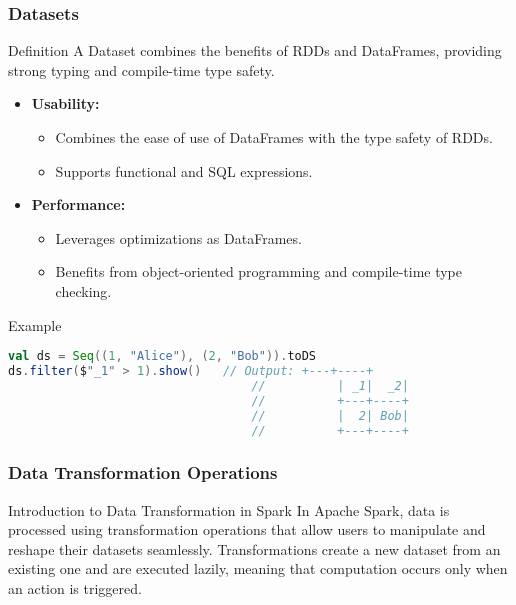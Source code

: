 \documentclass{beamer}
\begin{document}
\begin{frame}[fragile]
    \frametitle{Datasets}
    \begin{block}{Definition}
        A Dataset combines the benefits of RDDs and DataFrames, providing strong typing and compile-time type safety.
    \end{block}

    \begin{itemize}
        \item \textbf{Usability:}
        \begin{itemize}
            \item Combines the ease of use of DataFrames with the type safety of RDDs.
            \item Supports functional and SQL expressions.
        \end{itemize}
        \item \textbf{Performance:}
        \begin{itemize}
            \item Leverages optimizations as DataFrames.
            \item Benefits from object-oriented programming and compile-time type checking.
        \end{itemize}
    \end{itemize}

    \begin{block}{Example}
    \begin{lstlisting}[language=Scala]
val ds = Seq((1, "Alice"), (2, "Bob")).toDS
ds.filter($"_1" > 1).show()   // Output: +---+----+
                                  //          | _1|  _2|
                                  //          +---+----+
                                  //          |  2| Bob|
                                  //          +---+----+
    \end{lstlisting}
    \end{block}
\end{frame}

\begin{frame}[fragile]
    \frametitle{Data Transformation Operations}
    \begin{block}{Introduction to Data Transformation in Spark}
        In Apache Spark, data is processed using transformation operations that allow users to manipulate and reshape their datasets seamlessly. Transformations create a new dataset from an existing one and are executed lazily, meaning that computation occurs only when an action is triggered.
    \end{block}
\end{frame}
\end{document}

